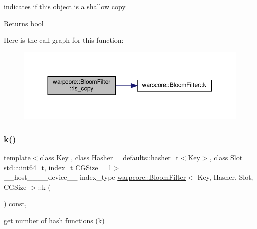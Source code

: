 indicates if this object is a shallow copy 

\begin{DoxyReturn}{Returns}
{\ttfamily bool} 
\end{DoxyReturn}
Here is the call graph for this function\+:
\nopagebreak
\begin{figure}[H]
\begin{center}
\leavevmode
\includegraphics[width=350pt]{classwarpcore_1_1BloomFilter_a55aaae73d8a1a8d811779fcf372f6c8c_cgraph}
\end{center}
\end{figure}
\mbox{\label{classwarpcore_1_1BloomFilter_a33c972e8a462625d6253b58bbd5585f3}} 
\subsubsection{\texorpdfstring{k()}{k()}}
{\footnotesize\ttfamily template$<$class Key , class Hasher  = defaults\+::hasher\+\_\+t$<$\+Key$>$, class Slot  = std\+::uint64\+\_\+t, index\+\_\+t C\+G\+Size = 1$>$ \\
\+\_\+\+\_\+host\+\_\+\+\_\+\+\_\+\+\_\+device\+\_\+\+\_\+ index\+\_\+type \hyperlink{classwarpcore_1_1BloomFilter}{warpcore\+::\+Bloom\+Filter}$<$ Key, Hasher, Slot, C\+G\+Size $>$\+::k (\begin{DoxyParamCaption}{ }\end{DoxyParamCaption}) const\hspace{0.3cm}{\ttfamily [inline]}, {\ttfamily [noexcept]}}



get number of hash functions (k) 

